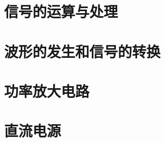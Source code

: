 \documentclass[cn,pad,11pt,geye]{elegantnote}
\begin{document}
\section{信号的运算与处理}
\section{波形的发生和信号的转换}
\section{功率放大电路}
\section{直流电源}
\end{document}
